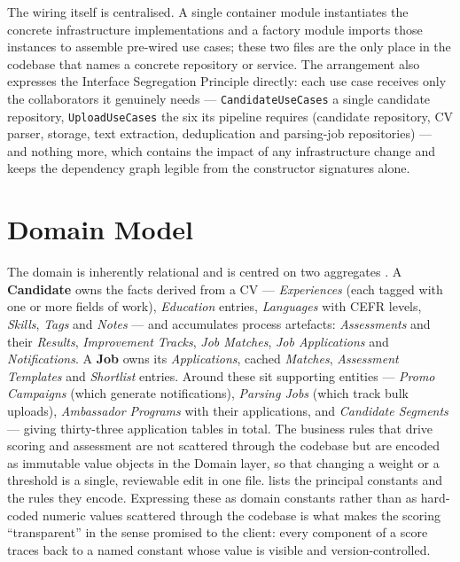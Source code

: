 The wiring itself is centralised. A single container module instantiates the
concrete infrastructure implementations and a factory module imports those
instances to assemble pre-wired use cases; these two files are the only place
in the codebase that names a concrete repository or service. The arrangement
also expresses the Interface Segregation Principle directly: each use case
receives only the collaborators it genuinely needs ---
\texttt{CandidateUseCases} a single candidate repository,
\texttt{UploadUseCases} the six its pipeline requires (candidate repository,
CV parser, storage, text extraction, deduplication and parsing-job
repositories) --- and nothing more, which contains the impact of any
infrastructure change and keeps the dependency graph legible from the
constructor signatures alone.


\section{Domain Model}
\label{sec:design-domain}

The domain is inherently relational and is centred on two aggregates
\parencite{Evans2003,Vernon2013IDDD}. A
\textbf{Candidate} owns the facts derived from a CV --- \textit{Experiences}
(each tagged with one or more fields of work), \textit{Education} entries,
\textit{Languages} with CEFR levels, \textit{Skills}, \textit{Tags} and
\textit{Notes} --- and accumulates process artefacts: \textit{Assessments}
and their \textit{Results}, \textit{Improvement Tracks}, \textit{Job
Matches}, \textit{Job Applications} and \textit{Notifications}. A
\textbf{Job} owns its \textit{Applications}, cached \textit{Matches},
\textit{Assessment Templates} and \textit{Shortlist} entries. Around these
sit supporting entities --- \textit{Promo Campaigns} (which generate
notifications), \textit{Parsing Jobs} (which track bulk uploads),
\textit{Ambassador Programs} with their applications, and \textit{Candidate
Segments} --- giving thirty-three application tables in total.
The business rules that drive scoring and assessment are not scattered
through the codebase but are encoded as immutable value objects in the Domain
layer, so that changing a weight or a threshold is a single, reviewable edit
in one file.  lists the principal constants and
the rules they encode. Expressing these as domain constants rather than as
hard-coded numeric values scattered through the codebase is what makes the scoring ``transparent'' in
the sense promised to the client: every component of a score traces back to a
named constant whose value is visible and version-controlled.

